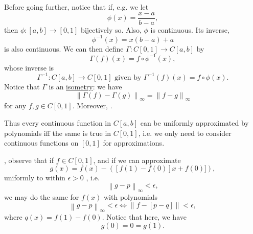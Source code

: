 \documentclass[notoc,notitlepage]{tufte-book}
\newcommand{\norm}[1]{\left\| #1 \right\|}
\begin{document}
Before going further, notice that if, e.g. we let
\begin{equation*}
  \phi(x) = \frac{x - a}{b - a},
\end{equation*}
then $\phi : [a, b] \to [0, 1]$ bijectively so. Also, $\phi$ is continuous. Its inverse,
\begin{equation*}
  \phi^{-1}(x) = x(b - a) + a
\end{equation*}
is also continuous. We can then define $\Gamma: C[0, 1] \to C[a, b]$ by
\begin{equation*}
  \Gamma(f)(x) = f \circ \phi^{-1}(x),
\end{equation*}
whose inverse is
\begin{equation*}
  \Gamma^{-1} : C[a, b] \to C[0, 1] \text{ given by } \Gamma^{-1}(f)(x) = f \circ \phi(x).
\end{equation*}
Notice that $\Gamma$ is an \hyperref[defn:isometry]{isometry}: we have
\begin{equation*}
  \norm{ \Gamma(f) - \Gamma(g) }_\infty = \norm{ f - g }_\infty
\end{equation*}
for any $f, g \in C[0, 1]$. Moreover, .

Thus every continuous function in $C[a, b]$ can be uniformly approximated by polynomials iff the same is true in $C[0, 1]$, i.e. we only need to consider continuous functions on $[0, 1]$ for approximations.

, observe that if $f \in C[0, 1]$, and if we can approximate
\begin{equation*}
  g(x) = f(x) - ([f(1) - f(0)] x + f(0)]),
\end{equation*}
uniformly to within $\epsilon > 0$ , i.e.
\begin{equation*}
  \norm{ g - p }_\infty < \epsilon,
\end{equation*}
we may do the same for $f(x)$ with polynomials
\begin{equation*}
  \norm{g - p}_\infty < \epsilon \iff \norm{ f - [p - q] } < \epsilon,
\end{equation*}
where $q(x) = f(1) - f(0)$. Notice that here, we have
\begin{equation*}
  g(0) = 0 = g(1).
\end{equation*}
\end{document}
